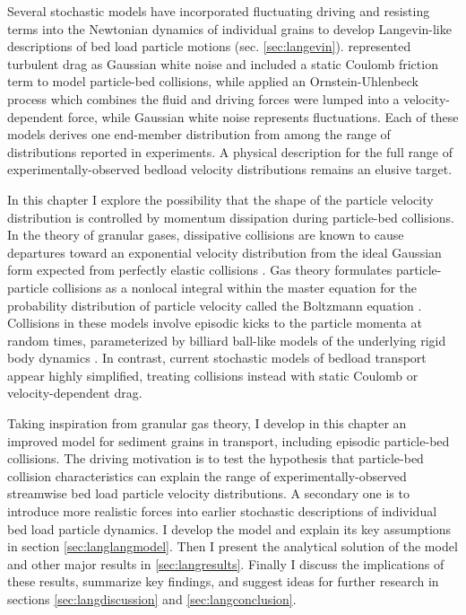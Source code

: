 Several stochastic models have incorporated fluctuating driving and resisting terms into the Newtonian dynamics of individual grains to develop Langevin-like descriptions of bed load particle motions (sec. \ref{sec:langevin}). \citet{Fan2014} represented turbulent drag as Gaussian white noise and included a static Coulomb friction term to model particle-bed collisions, while \citet{Ancey2014} applied an Ornstein-Uhlenbeck process which combines the fluid and driving forces were lumped into a velocity-dependent force, while Gaussian white noise represents fluctuations.
Each of these models derives one end-member distribution from among the range of distributions reported in experiments.
A physical description for the full range of experimentally-observed bedload velocity distributions remains an elusive target.

In this chapter I explore the possibility that the shape of the particle velocity distribution is controlled by momentum dissipation during particle-bed collisions.
In the theory of granular gases, dissipative collisions are known to cause departures toward an exponential velocity distribution from the ideal Gaussian form expected from perfectly elastic collisions \citep{Brilliantov2004}.
Gas theory formulates particle-particle collisions as a nonlocal integral within the master equation for the probability distribution of particle velocity called the Boltzmann equation \citep{Chapman1970,Landau1980}.
Collisions in these models involve episodic kicks to the particle momenta at random times, parameterized by billiard ball-like models of the underlying rigid body dynamics \citep[e.g.][]{Brach1989}.
In contrast, current stochastic models of bedload transport appear highly simplified, treating collisions instead with static Coulomb or velocity-dependent drag.

Taking inspiration from granular gas theory, I develop in this chapter an improved model for sediment grains in transport, including episodic particle-bed collisions.
The driving motivation is to test the hypothesis that particle-bed collision characteristics can explain the range of experimentally-observed streamwise bed load particle velocity distributions.
A secondary one is to introduce more realistic forces into earlier stochastic descriptions of individual bed load particle dynamics. 
I develop the model and explain its key assumptions in section \ref{sec:langlangmodel}. Then I present the analytical solution of the model and other major results in \ref{sec:langresults}. Finally I discuss the implications of these results, summarize key findings, and suggest ideas for further research in sections \ref{sec:langdiscussion} and \ref{sec:langconclusion}.



